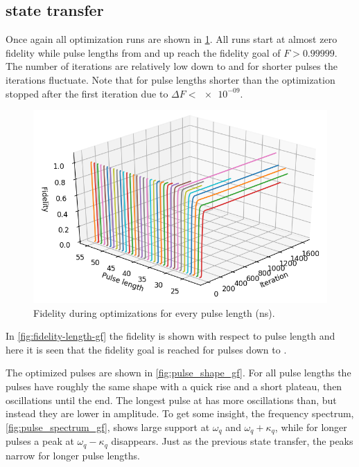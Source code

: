 \documentclass[main.tex]{subfiles}
\begin{document}
\clearpage{}
\subsection{%
	\texorpdfstring{}{0 -> 2} state transfer
}
Once again all optimization runs are shown in \cref{fig:3d-optim-gf}.
All runs start at almost zero fidelity while pulse lengths from  and up reach the fidelity goal of \(F > 0.99999\).
The number of iterations are relatively low down to  and for shorter pulses the iterations fluctuate.
Note that for pulse lengths shorter than  the optimization stopped after the first iteration due to \(\Delta F < \num{e-09}\).

\begin{figure}
    \centering
    \includegraphics[width=0.7\linewidth]{figs/3d-optim-gf.png}
	\caption{Fidelity during optimizations for every pulse length (ns).}%
	\label{fig:3d-optim-gf}
\end{figure}

In \cref{fig:fidelity-length-gf} the fidelity is shown with respect to pulse length and here it is seen that the fidelity goal is reached for pulses down to .


The optimized pulses are shown in \cref{fig:pulse_shape_gf}.
For all pulse lengths the pulses have roughly the same shape with a quick rise and a short plateau, then oscillations until the end. 
The longest pulse at  has more oscillations than, but instead they are lower in amplitude.
To get some insight, the frequency spectrum, \cref{fig:pulse_spectrum_gf}, shows large support at \(\omega_q\) and \(\omega_q+\kappa_q\), while for longer pulses a peak at \(\omega_q-\kappa_q\) disappears.
Just as the previous state transfer, the peaks narrow for longer pulse lengths.
\end{document}
